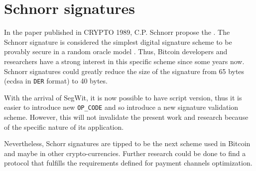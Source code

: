 \section{Schnorr signatures}

In the paper 
published in CRYPTO 1989, C.P. Schnorr propose the  \cite{10.1007/0-387-34805-0_22}. The Schnorr signature is considered
the simplest digital signature scheme to be provably secure in a random oracle
model \cite{Bellare:1993:ROP:168588.168596, 10.1007/978-3-642-29011-4_33}. Thus,
Bitcoin developers and researchers have a strong interest in this specific
scheme since some years now. Schnorr signatures could greatly reduce the size of
the signature from 65 bytes (\gls{ecdsa} in \texttt{DER} format) to 40 bytes.

With the arrival of SegWit, it is now possible to have script version, thus it
is easier to introduce new \texttt{OP\_CODE} and so introduce a new signature
validation scheme. However, this will not invalidate the present work and
research because of the specific nature of its application.

Nevertheless, Schorr signatures are tipped to be the next scheme used in Bitcoin
and maybe in other crypto-currencies. Further research could be done to find a
protocol that fulfills the requirements defined for payment channels
optimization.
